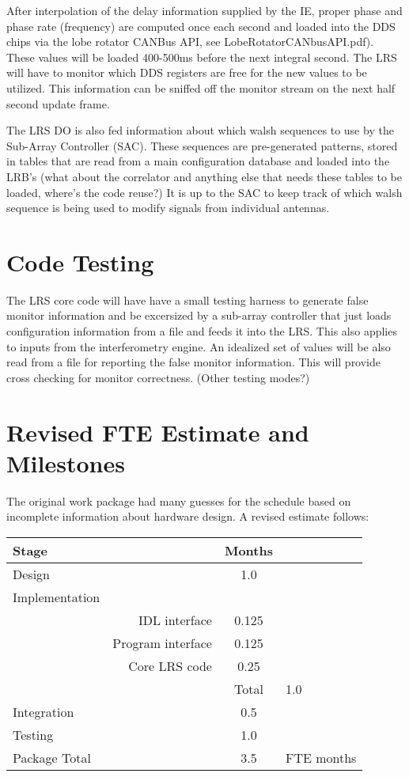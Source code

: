 \documentclass[preprint]{aastex}
\begin{document}
After interpolation of the delay information supplied by the IE, proper phase and phase
rate (frequency) are computed once each second and loaded into the DDS chips
via the lobe rotator CANBus API, see LobeRotatorCANbusAPI.pdf).  These values will
be loaded 400-500ms before the next integral second.  The LRS will have to
monitor which DDS registers are free for the new values to be utilized.  This
information can be sniffed off the monitor stream on the next half second update frame.

The LRS DO is also fed information about which walsh sequences to
use by the Sub-Array Controller (SAC).  These sequences are pre-generated
patterns, stored in tables that are read from a main configuration
database and loaded into the LRB's (what about the correlator and
anything else that needs these tables to be loaded, where's the code
reuse?)  It is up to the SAC to keep track of which walsh sequence is being
used to modify signals from individual antennas.

\section{Code Testing}
The LRS core code will have have a small testing harness to
generate false monitor information and be excersized by a
sub-array controller that just loads configuration information
from a file and feeds it into the LRS.  This also applies
to inputs from the interferometry engine.  An idealized set of values
will be also read from a file for reporting the false monitor
information.  This will provide cross checking for monitor
correctness.  (Other testing modes?)

\clearpage

\section{Revised FTE Estimate and Milestones}
The original work package had many guesses for the schedule
based on incomplete information about hardware design.  A
revised estimate follows:

\begin{tabular}{lrcl}
\hline
Stage & & Months & \\
\hline
Design  & & 1.0 & \\
Implementation& & & \\
  & IDL interface & 0.125 & \\
  & Program interface & 0.125 & \\
  & Core LRS code & 0.25 & \\
  &       \cline{1-2}
  & Total             & 1.0 & \\
Integration & &  0.5 & \\
Testing & & 1.0 & \\
\hline
Package Total & & 3.5 & FTE months  \\
\end{tabular}
\end{document}
